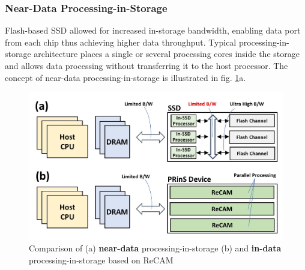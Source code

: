 \documentclass{superfri}
\begin{document}
	\subsubsection{Near-Data Processing-in-Storage}
	\label{sec:NDP_PRinS}
	Flash-based SSD allowed for increased in-storage bandwidth, enabling data port from each chip thus achieving higher data throughput. Typical processing-in-storage architecture places a single or several processing cores inside the storage and allows data processing without transferring it to the host processor. The concept of near-data processing-in-storage is illustrated in fig. \ref{fig:in_vs_near_data}a. 
	
	\begin{figure}[h!]
		\centerline{\includegraphics[scale=0.8]{Figures/In_vs_near_data.jpg}}
		\caption{Comparison of (a) \textbf{near-data} processing-in-storage (b) and \textbf{in-data} processing-in-storage based on ReCAM}
		\label{fig:in_vs_near_data}
	\end{figure}
	
\end{document}
